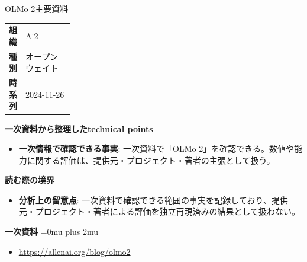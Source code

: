 \begin{technicalnote}{OLMo 2}{主要資料}
\begingroup
\begin{tabularx}{\linewidth}{@{}>{\bfseries}p{0.22\linewidth}X@{}}
組織 & Ai2 \\
種別 & オープンウェイト \\
時系列 & 2024-11-26 \\
\end{tabularx}
\smallskip
{\bfseries 一次資料から整理したtechnical points}
\begin{itemize}[leftmargin=1.5em,itemsep=0.35em]
\item \textbf{一次情報で確認できる事実}: 一次資料で「OLMo 2」を確認できる。数値や能力に関する評価は、提供元・プロジェクト・著者の主張として扱う。
\end{itemize}
\begin{minipage}{\linewidth}
{\bfseries 読む際の境界}
\begin{itemize}[leftmargin=1.5em,itemsep=0.35em]
\item \textbf{分析上の留意点}: 一次資料で確認できる範囲の事実を記録しており、提供元・プロジェクト・著者による評価を独立再現済みの結果として扱わない。
\end{itemize}
\begin{samepage}
{\bfseries 一次資料}
\begingroup\sloppy
\Urlmuskip=0mu plus 2mu\relax
\begin{itemize}[leftmargin=1.5em,itemsep=0.25em]
\item {\scriptsize\url{https://allenai.org/blog/olmo2}}
\end{itemize}
\endgroup
\end{samepage}
\end{minipage}
\endgroup
\end{technicalnote}
\medskip

